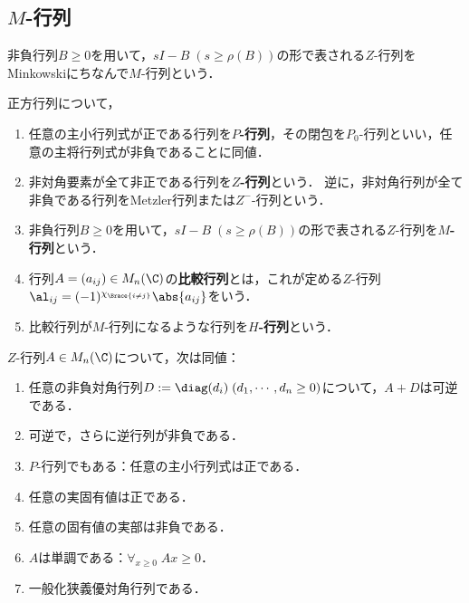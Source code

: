 \documentclass[uplatex, dvipdfmx]{jsreport}
\begin{document}
\subsection{$M$-行列}

\begin{tcolorbox}[colframe=ForestGreen, colback=ForestGreen!10!white,breakable,colbacktitle=ForestGreen!40!white,coltitle=black,fonttitle=\bfseries\sffamily,
title=]
    非負行列$B\ge0$を用いて，$sI-B\;(s\ge\rho(B))$の形で表される$Z$-行列をMinkowskiにちなんで$M$-行列という． 
\end{tcolorbox}

\begin{definition}
    正方行列について，
    \begin{enumerate}
        \item 任意の主小行列式が正である行列を\textbf{$P$-行列}，その閉包を$P_0$-行列といい，任意の主将行列式が非負であることに同値．
        \item 非対角要素が全て非正である行列を\textbf{$Z$-行列}という．
        逆に，非対角行列が全て非負である行列をMetzler行列または$Z^-$-行列という．
        \item 非負行列$B\ge0$を用いて，$sI-B\;(s\ge\rho(B))$の形で表される$Z$-行列を\textbf{$M$-行列}という．
        \item 行列$A=(a_{ij})\in M_n(\C)$の\textbf{比較行列}とは，これが定める$Z$-行列$\al_{ij}=(-1)^{\chi_{\Brace{i\ne j}}}\abs{a_{ij}}$をいう．
        \item 比較行列が$M$-行列になるような行列を\textbf{$H$-行列}という．
    \end{enumerate}
\end{definition}

\begin{theorem}
    $Z$-行列$A\in M_n(\C)$について，次は同値：
    \begin{enumerate}
        \item 任意の非負対角行列$D:=\diag(d_i)\;(d_1,\cdots,d_n\ge0)$について，$A+D$は可逆である．
        \item 可逆で，さらに逆行列が非負である．
        \item $P$-行列でもある：任意の主小行列式は正である．
        \item 任意の実固有値は正である．
        \item 任意の固有値の実部は非負である．
        \item $A$は単調である：$\forall_{x\ge0}\;Ax\ge0$．
        \item 一般化狭義優対角行列である．
    \end{enumerate}
\end{theorem}
\end{document}
